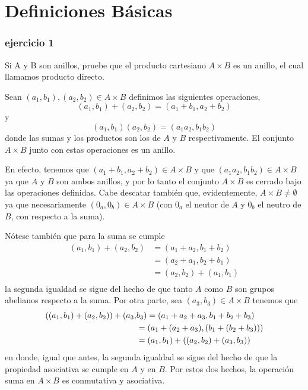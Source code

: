 
 \thispagestyle{plain}
\chapter*{Definiciones Básicas}
\subsection*{ejercicio 1}
	Si A y B son anillos, pruebe que el producto cartesiano $A \times B$ es un anillo, el cual llamamos producto directo. 
\begin{sol}
	Sean $(a_1,b_1),(a_2,b_2) \in A \times B$ definimos las siguientes operaciones,
	 \[(a_1,b_1)+(a_2,b_2)=(a_1+b_1,a_2+b_2)\]
	 y 
	 \[(a_1,b_1)(a_2,b_2)=(a_1a_2,b_1b_2)\]
	 donde las sumas y los productos son los de $A$ y $B$ respectivamente. El conjunto $A \times B$ junto con estas operaciones es un anillo.
	
	En efecto, tenemos que $(a_1+b_1,a_2+b_2) \in A \times B$ y que $(a_1a_2,b_1b_2) \in A \times B$ ya que $A$ y $B$ son ambos anillos, y por lo tanto el conjunto $A \times B$ es cerrado bajo las operaciones definidas. Cabe descatar también que, evidentemente, $A \times B \neq \emptyset$ ya que necesariamente $(0_a,0_b) \in A \times B$  (con $0_a$ el neutor de $A$ y $0_b$ el neutro de $B$, con respecto a la suma).
	
	Nótese también que para la suma se cumple
	\begin{align*}
		(a_1,b_1) + (a_2,b_2) &= (a_1 + a_2, b_1+b_2) \\ 
							  &= (a_2+a_1, b_2+b_1) \\
							  &= (a_2,b_2) + (a_1,b_1) \\
	\end{align*}
	la segunda igualdad se sigue del hecho de que tanto $A$ como $B$ son grupos abelianos respecto a la suma. Por otra parte, sea $(a_3,b_3) \in A \times B$ tenemos que
	\begin{align*}\small
	((a_1,b_1) + (a_2,b_2)) + (a_3,&b_3) = (a_1+a_2+a_3,b_1+b_2+b_3) \\
										&= (a_1+(a_2+a_3),(b_1+(b_2+b_3))) \\
										&= (a_1,b_1) + ((a_2,b_2) + (a_3,b_3))
	\end{align*}
	en donde, igual que antes, la segunda igualdad se sigue del hecho de que la propiedad asociativa se cumple en $A$ y en $B$. Por estos dos hechos, la operación suma en $A \times B$ es conmutativa y asociativa.
	

\end{sol}
